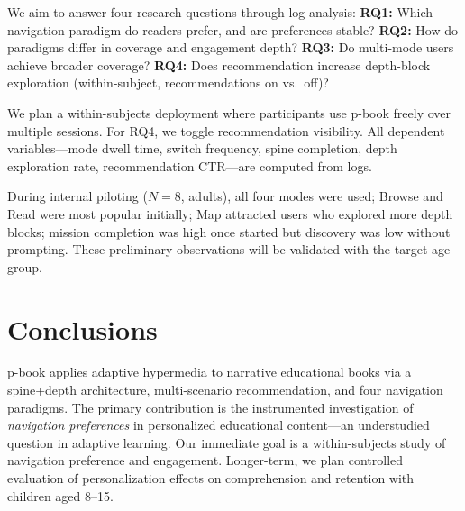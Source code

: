 \documentclass[sigconf]{acmart}
\begin{document}
We aim to answer four research questions through log analysis:
\textbf{RQ1:} Which navigation paradigm do readers prefer, and are preferences stable?
\textbf{RQ2:} How do paradigms differ in coverage and engagement depth?
\textbf{RQ3:} Do multi-mode users achieve broader coverage?
\textbf{RQ4:} Does recommendation increase depth-block exploration (within-subject, recommendations on vs.\ off)?

We plan a within-subjects deployment where participants use p-book freely over multiple sessions. For RQ4, we toggle recommendation visibility. All dependent variables---mode dwell time, switch frequency, spine completion, depth exploration rate, recommendation CTR---are computed from logs.

During internal piloting ($N{=}8$, adults), all four modes were used; Browse and Read were most popular initially; Map attracted users who explored more depth blocks; mission completion was high once started but discovery was low without prompting. These preliminary observations will be validated with the target age group.

\section{Conclusions}

p-book applies adaptive hypermedia to narrative educational books via a spine+depth architecture, multi-scenario recommendation, and four navigation paradigms. The primary contribution is the instrumented investigation of \emph{navigation preferences} in personalized educational content---an understudied question in adaptive learning. Our immediate goal is a within-subjects study of navigation preference and engagement. Longer-term, we plan controlled evaluation of personalization effects on comprehension and retention with children aged 8--15.


\end{document}
